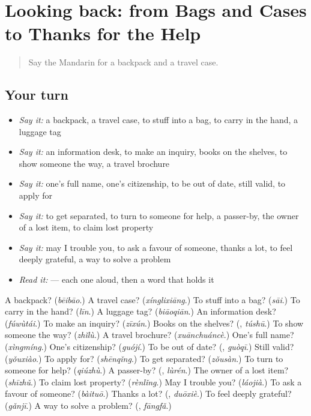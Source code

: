 \section[(dialogue)]{Looking back: from Bags and Cases to Thanks for the Help}

\label{lesson:ZH-R457-review-453-457}



\begin{quote}
Say the Mandarin for a backpack and a travel case.
\end{quote}

\subsection*{Your turn}
\begin{itemize}
\raggedright
  \item \emph{Say it:} a backpack, a travel case, to stuff into a bag, to carry in the hand, a luggage tag
  \item \emph{Say it:} an information desk, to make an inquiry, books on the shelves, to show someone the way, a travel brochure
  \item \emph{Say it:} one's full name, one's citizenship, to be out of date, still valid, to apply for
  \item \emph{Say it:} to get separated, to turn to someone for help, a passer-by, the owner of a lost item, to claim lost property
  \item \emph{Say it:} may I trouble you, to ask a favour of someone, thanks a lot, to feel deeply grateful, a way to solve a problem
  \item \emph{Read it:}  — each one aloud, then a word that holds it
\end{itemize}

\begin{tcolorbox}[breakable,colback=teal!4,colframe=teal!35!black,title={Before you move on}]
A backpack? (\emph{bēibāo}.) A travel case? (\emph{xínglixiāng}.) To stuff into a bag? (\emph{sāi}.) To carry in the hand? (\emph{līn}.) A luggage tag? (\emph{biāoqiān}.) An information desk? (\emph{fúwùtái}.) To make an inquiry? (\emph{zīxún}.) Books on the shelves? (\textbf{}, \emph{túshū}.) To show someone the way? (\emph{zhǐlù}.) A travel brochure? (\emph{xuānchuáncè}.) One's full name? (\emph{xìngmíng}.) One's citizenship? (\emph{guójí}.) To be out of date? (\textbf{}, \emph{guòqī}.) Still valid? (\emph{yǒuxiào}.) To apply for? (\emph{shēnqǐng}.) To get separated? (\emph{zǒusàn}.) To turn to someone for help? (\emph{qiúzhù}.) A passer-by? (\textbf{}, \emph{lùrén}.) The owner of a lost item? (\emph{shīzhǔ}.) To claim lost property? (\emph{rènlǐng}.) May I trouble you? (\emph{láojià}.) To ask a favour of someone? (\emph{bàituō}.) Thanks a lot? (\textbf{}, \emph{duōxiè}.) To feel deeply grateful? (\emph{gǎnjī}.) A way to solve a problem? (\textbf{}, \emph{fāngfǎ}.)
\end{tcolorbox}
